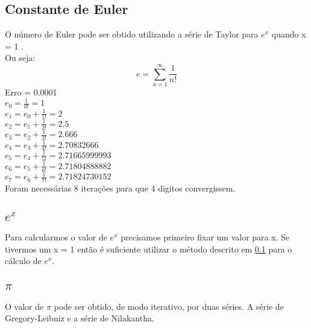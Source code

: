 \documentclass[11pt]{article}
\begin{document}
\subsection{Constante de Euler}\label{sec:euler}
O número de Euler pode ser obtido utilizando a série de Taylor para $e^x$ quando x = 1 \cite{euler}.\\
Ou seja: $$e = \sum_{n=1}^{\infty} \frac{1}{n!}$$
Erro = 0.0001 \\
$e_0 = \frac{1}{0!} = 1$\\
$e_1 = e_0 + \frac{1}{1!} = 2$\\
$e_2 = e_1 + \frac{1}{2!} = 2.5$\\
$e_3 = e_2 + \frac{1}{3!} = 2.666$\\
$e_4 = e_3 + \frac{1}{4!} = 2.70832666$\\
$e_5 = e_4 + \frac{1}{5!} = 2.71665999993$\\
$e_6 = e_5 + \frac{1}{6!} = 2.71804888882$\\
$e_7 = e_6 + \frac{1}{7!} = 2.71824730152$\\

Foram necessárias 8 iterações para que 4 digitos convergissem. \\

\subsection{$e^x$}
Para calcularmos o valor de $e^x$ precisamos primeiro fixar um valor para x. Se tivermos um x = 1 então é suficiente utilizar o método
descrito em \ref{sec:euler} para o cálculo de $e^x$.

\subsection{$\pi$}
O valor de $\pi$ pode ser obtido, de modo iterativo, por duas séries. A série de Gregory-Leibniz e a série de Nilakantha. \cite{pi}
\end{document}
